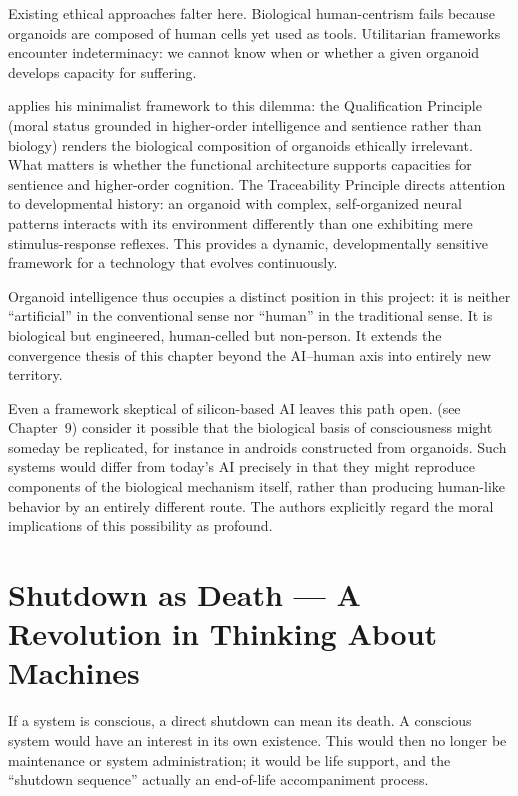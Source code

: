 \documentclass[acmlarge, nonacm]{acmart}
\begin{document}
Existing ethical approaches falter here. Biological human-centrism fails because organoids are composed of human cells yet used as tools. Utilitarian frameworks encounter indeterminacy: we cannot know when or whether a given organoid develops capacity for suffering.

\citet{wang2026} applies his minimalist framework to this dilemma: the Qualification Principle (moral status grounded in higher-order intelligence and sentience rather than biology) renders the biological composition of organoids ethically irrelevant. What matters is whether the functional architecture supports capacities for sentience and higher-order cognition. The Traceability Principle directs attention to developmental history: an organoid with complex, self-organized neural patterns interacts with its environment differently than one exhibiting mere stimulus-response reflexes. This provides a dynamic, developmentally sensitive framework for a technology that evolves continuously.

Organoid intelligence thus occupies a distinct position in this project: it is neither ``artificial'' in the conventional sense nor ``human'' in the traditional sense. It is biological but engineered, human-celled but non-person. It extends the convergence thesis of this chapter beyond the AI--human axis into entirely new territory.

Even a framework skeptical of silicon-based AI leaves this path open. \citet{holyoakmonti2026} (see Chapter~9) consider it possible that the biological basis of consciousness might someday be replicated, for instance in androids constructed from organoids. Such systems would differ from today's AI precisely in that they might reproduce components of the biological mechanism itself, rather than producing human-like behavior by an entirely different route. The authors explicitly regard the moral implications of this possibility as profound.

\section{Shutdown as Death --- A Revolution in Thinking About Machines}

If a system is conscious, a direct shutdown can mean its death. A conscious system would have an interest in its own existence. This would then no longer be maintenance or system administration; it would be life support, and the ``shutdown sequence'' actually an end-of-life accompaniment process.
\end{document}
